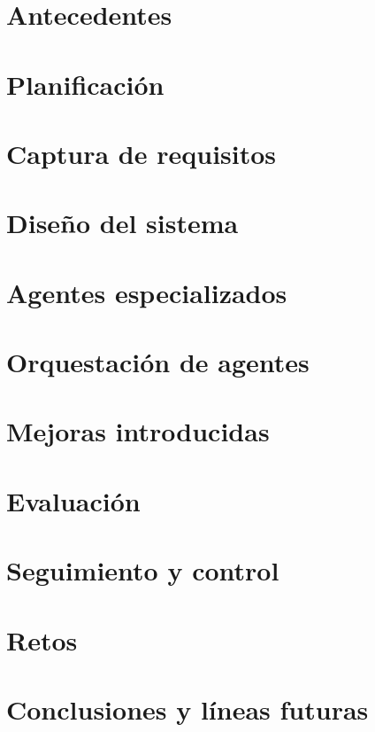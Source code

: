 \documentclass[a4page, 11pt, showtrims]{memoir}
\begin{document}
\chapter{Antecedentes} \label{ch:chap2}

\clearpage
\chapter{Planificación} \label{ch:chap3}

\clearpage
\chapter{Captura de requisitos} \label{ch:chap4}

\clearpage
\chapter{Diseño del sistema} \label{ch:chap5}

\clearpage
\chapter{Agentes especializados} \label{ch:chap6}

\clearpage
\chapter{Orquestación de agentes} \label{ch:chap7}

\clearpage
\chapter{Mejoras introducidas} \label{ch:chap8}

\clearpage
\chapter{Evaluación} \label{ch:chap9}

\clearpage
\chapter{Seguimiento y control} \label{ch:chap10}

\clearpage
\chapter{Retos} \label{ch:chap11}

\clearpage
\chapter{Conclusiones y líneas futuras} \label{ch:chap12}

\clearpage
\end{document}
